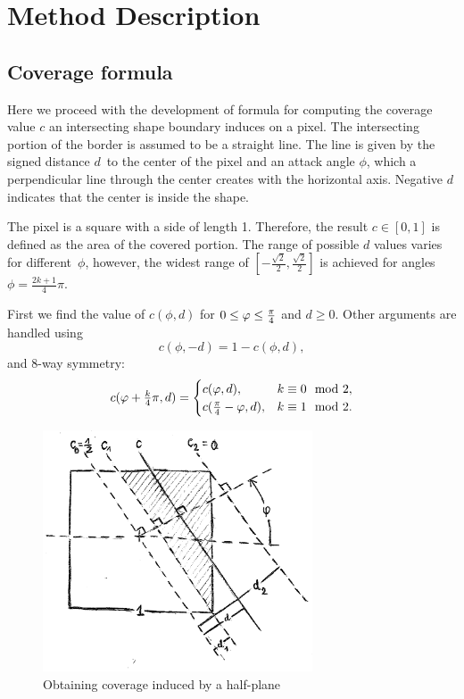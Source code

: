 \section{Method Description}

\subsection{Coverage formula}

Here we proceed with the development of formula for computing the coverage value $c$ an intersecting shape boundary induces on a pixel. The intersecting portion of the border is assumed to be a straight line. The line is given by the signed distance $d$~to the center of the pixel and an attack angle $\phi$, which a perpendicular line through the center creates with the horizontal axis. Negative $d$ indicates that the center is inside the shape.

The pixel is a square with a side of length 1. Therefore, the result $c \in [0, 1]$ is defined as the area of the covered portion. The range of possible $d$ values varies for different~$\phi$, however, the widest range of $[-\frac{\sqrt{2}}{2}, \frac{\sqrt{2}}{2}]$ is achieved for angles $\phi = \frac{2k + 1}{4} \pi$.

First we find the value of $c(\phi, d)$ for $0 \leq \varphi \leq \tfrac{\pi}{4}$ and $d \geq 0$. Other arguments are handled using
\begin{equation}
    c(\phi, -d) = 1 - c(\phi, d),
\end{equation}
and 8-way symmetry:
\begin{equation}
    c(\varphi + \tfrac{k}{4}\pi, d) = \begin{cases}
    	c(              \varphi, d), & k \equiv 0 \mod 2, \\
        c(\tfrac{\pi}{4} - \varphi, d), & k \equiv 1 \mod 2.
    \end{cases}
\end{equation}

\begin{figure}\label{fig:coverage-formula}
	\includegraphics[width=8cm]{img/coverage-formula.png}
    \caption{Obtaining coverage induced by a half-plane}
\end{figure}

